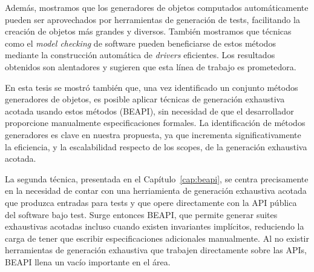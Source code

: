 Además, mostramos que los generadores de objetos computados automáticamente pueden ser aprovechados por herramientas de generación de tests, facilitando la creación de objetos más grandes y diversos. 
También mostramos que técnicas como el \emph{model checking} de software pueden beneficiarse de estos métodos mediante la construcción automática de \emph{drivers} eficientes. 
Los resultados obtenidos son alentadores y sugieren que esta línea de trabajo es prometedora.


En esta tesis se mostró también que, una vez identificado un
conjunto métodos generadores de objetos, es posible aplicar técnicas de generación 
exhaustiva acotada usando estos métodos (\textsf{BEAPI}), sin necesidad de que el desarrollador
proporcione manualmente especificaciones formales. La identificación
de métodos generadores es clave en nuestra propuesta, ya que incrementa significativamente la eficiencia, y la escalabilidad
respecto de los scopes, de la generación exhaustiva acotada.

La segunda técnica, presentada en el Capítulo~\ref{cap:beapi}, se centra precisamente en la necesidad de contar con una herriamienta
de generación exhaustiva acotada que produzca entradas para tests y que opere
directamente con la API pública del software bajo test. 
Surge entonces BEAPI, que permite generar suites exhaustivas acotadas incluso cuando existen invariantes implícitos, 
reduciendo la carga de tener que escribir especificaciones adicionales manualmente.
Al no existir herramientas de generación exhaustiva que trabajen directamente
sobre las APIs, BEAPI llena un vacío importante en el área.


